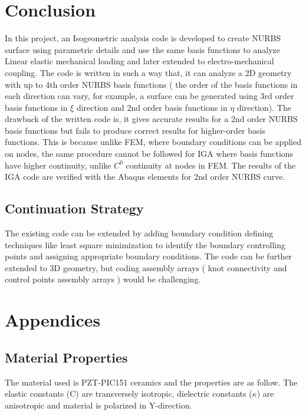 \documentclass[11pt]{article}
\begin{document}
\section{Conclusion}
In this project, an Isogeometric analysis code is developed to create NURBS surface using parametric details and use the same basis functions to analyze Linear elastic mechanical loading and later extended to electro-mechanical coupling. The code is written in such a way that, it can analyze a 2D geometry with up to 4th order NURBS basis functions ( the order of the basis functions in each direction can vary, for example, a surface can be generated using 3rd order basis functions in $\xi$ direction and 2nd order basis functions in $\eta$ direction). The drawback of the written code is, it gives accurate results for a 2nd order NURBS basis functions but fails to produce correct results for higher-order basis functions. This is because unlike FEM, where boundary conditions can be applied on nodes, the same procedure cannot be followed for IGA where basis functions have higher continuity, unlike $C^0$ continuity at nodes in FEM. The results of the IGA code are verified with the Abaqus elements for 2nd order NURBS 	curve.

\subsection{Continuation Strategy}

The existing code can be extended by adding boundary condition defining techniques like least square minimization to identify the boundary controlling points and assigning appropriate boundary conditions. The code can be further extended to 3D geometry, but coding assembly arrays ( knot connectivity and control points assembly arrays ) would be challenging.


\newpage
\section{Appendices}

\subsection{Material Properties} \label{MaterialProps}
The material used is
PZT-PIC151 ceramics and the properties \cite{kozinov2018simulation} are as follow. The elastic constants (C) are transversely isotropic, dielectric constants ($\kappa$) are anisotropic and material is polarized in Y-direction. 
\end{document}
